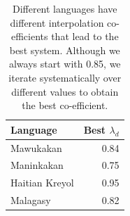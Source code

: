 \documentclass[11pt]{article}
\begin{document}
	\begin{table}
        \centering
		{\footnotesize
		\begin{tabular}{lr}
		\hline
		Language & Best $\lambda_{d}$ \\
		\hline
		Mawukakan & 0.84 \\
		Maninkakan & 0.75 \\
		Haitian Kreyol & 0.95 \\
		Malagasy & 0.82 \\
		\hline
		\end{tabular}
        }
		\caption{Different languages have different interpolation co-efficients that lead to the best system. Although we always start with 0.85, we iterate systematically over different values to obtain the best co-efficient.}
		\label{table:condor_run}
	\end{table}

\end{document}
